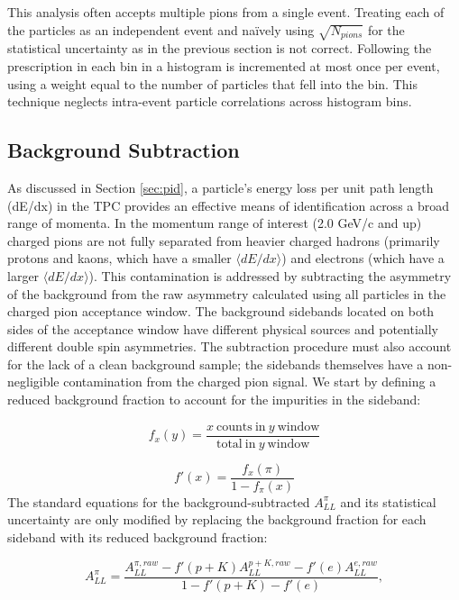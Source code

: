 This analysis often accepts multiple pions from a single event. Treating each
of the particles as an independent event and na\"ively using
$\sqrt{N_{pions}}$ for the statistical uncertainty as in the previous section
is not correct. Following the prescription in
\cite{sowinski-multiparticle-statistics} each bin in a histogram is
incremented at most once per event, using a weight equal to the number of
particles that fell into the bin. This technique neglects intra-event particle
correlations across histogram bins.

\subsection{Background Subtraction}

As discussed in Section \ref{sec:pid}, a particle's energy loss per unit path
length (dE/dx) in the TPC provides an effective means of identification across
a broad range of momenta. In the momentum range of interest (2.0 GeV/c and up)
charged pions are not fully separated from heavier charged hadrons (primarily protons and kaons, which have a smaller \(\langle dE/dx \rangle\)) and
electrons (which have a larger \(\langle dE/dx \rangle\)). This contamination is addressed by subtracting the asymmetry of
the background from the raw asymmetry calculated using all
particles in the charged pion acceptance window. The background sidebands located on both sides of the acceptance window have different physical sources and potentially different double spin asymmetries.  The subtraction
procedure must also account for the lack of a clean background sample; the
sidebands themselves have a non-negligible contamination from the charged pion
signal. We start by defining a reduced background fraction to account for the
impurities in the sideband:

\begin{equation*}
  f_{x}(y) = \frac{x~\mathrm{counts~in}~y~\mathrm{window}}{\mathrm{total~ in}~y~\mathrm{window}}
\end{equation*}

\begin{equation*}
  f'(x) = \frac{f_{x}(\pi)}{1 - f_{\pi}(x)}
\end{equation*}
%
The standard equations for the background-subtracted $A_{LL}^{\pi}$ and its
statistical uncertainty are only modified by replacing the background fraction
for each sideband with its reduced background fraction:

\begin{equation}
  A_{LL}^{\pi} = \frac{ A_{LL}^{\pi,raw} - f'(p+K)A_{LL}^{p+K,raw} - f'(e)A_{LL}^{e,raw} }{1 - f'(p+K) - f'(e) },
  \label{eqn:all}
\end{equation}

